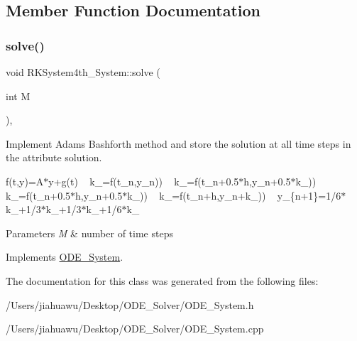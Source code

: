 \subsection{Member Function Documentation}
\mbox{\label{class_r_k_system4th___system_ae36715c58bf1afc191394185f36eb611}} 
\subsubsection{\texorpdfstring{solve()}{solve()}}
{\footnotesize\ttfamily void R\+K\+System4th\+\_\+\+System\+::solve (\begin{DoxyParamCaption}\item[{int}]{M }\end{DoxyParamCaption})\hspace{0.3cm}{\ttfamily [override]}, {\ttfamily [virtual]}}



Implement Adams Bashforth method and store the solution at all time steps in the attribute solution. 

f(t,y)=A$\ast$y+g(t) ~\newline
k\+\_=f(t\+\_\+n,y\+\_\+n)) ~\newline
k\+\_=f(t\+\_\+n+0.5$\ast$h,y\+\_\+n+0.5$\ast$k\+\_)) ~\newline
k\+\_=f(t\+\_\+n+0.5$\ast$h,y\+\_\+n+0.5$\ast$k\+\_)) ~\newline
k\+\_=f(t\+\_\+n+h,y\+\_\+n+k\+\_)) ~\newline
y\+\_\+\{n+1\}=1/6$\ast$k\+\_+1/3$\ast$k\+\_+1/3$\ast$k\+\_+1/6$\ast$k\+\_ ~\newline

\begin{DoxyParams}{Parameters}
{\em M} & number of time steps \\
\hline
\end{DoxyParams}


Implements \mbox{\hyperlink{class_o_d_e___system_a5fe78282ecf67d851f1a2363a028e6dd}{O\+D\+E\+\_\+\+System}}.



The documentation for this class was generated from the following files\+:\begin{DoxyCompactItemize}
\item 
/\+Users/jiahuawu/\+Desktop/\+O\+D\+E\+\_\+\+Solver/O\+D\+E\+\_\+\+System.\+h\item 
/\+Users/jiahuawu/\+Desktop/\+O\+D\+E\+\_\+\+Solver/O\+D\+E\+\_\+\+System.\+cpp\end{DoxyCompactItemize}
